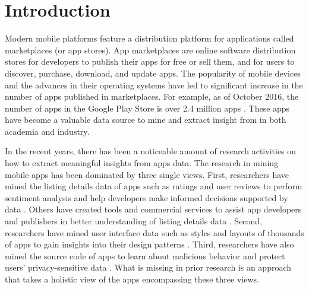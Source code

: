 \chapter{Introduction}
\label{ch:intro__chapter}
Modern mobile platforms feature a distribution platform for applications called marketplaces (or app stores).
App marketplaces are online software distribution stores for developers to publish their apps for free or sell them, and for users to discover, purchase, download, and update apps.
The popularity of mobile devices and the advances in their operating systems have led to significant increase in the number of apps published in marketplaces.
For example, as of October 2016, the number of apps in the Google Play Store is over 2.4 million apps \cite{appbrain_play_apps}.
These apps have become a valuable data source to mine and extract insight from in both academia and industry.

In the recent years, there has been a noticeable amount of research activities on how to extract meaningful insights from apps data. 
The research in mining mobile apps has been dominated by three single views.
First, researchers have mined the listing details data of apps such as ratings and user reviews to perform sentiment analysis and help developers make informed decisions supported by data \cite{fu_2013_KDD,chen_2014_ICSE,kong_2015_CCS}. 
Others have created tools and commercial services to assist app developers and publishers in better understanding of listing details data \cite{appfigures,applause,appannie}.
Second, researchers have mined user interface data such as styles and layouts of thousands of apps to gain insights into their design patterns \cite{shirazi_EICS_2013,Alharbi_2015_MobileHCI}.
Third, researchers have also mined the source code of apps to learn about malicious behavior and protect users' privacy-sensitive data \cite{zhou_2012_SP_dissecting,lu_2012_CCS,Arzt_2014_PLDI}.
What is missing in prior research is an approach that takes a holistic view of the apps encompassing these three views. 

